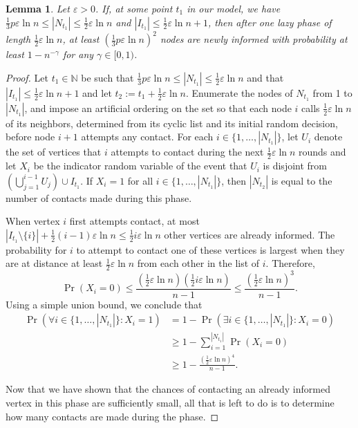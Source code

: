 \documentclass[12pt]{article}
\newtheorem{lemma}[theorem]{Lemma}
\newcommand{\e}{\varepsilon}
\newcommand{\N}{{\mathbb{N}}}
\begin{document}
{\begin{lemma}\label{LazyPhase2}
Let $\e>0$. If, at some point $t_1$ in our model, we have $\frac{1}{3}p\e\ln n \leq |N_{t_1}| \leq \frac{1}{2}\e\ln n$ and $|I_{t_1}|\leq \frac{1}{2}\e\ln n + 1$, then after one lazy phase of length $\frac{1}{2}\e\ln n$, at least $\left(\frac{1}{3}p\e\ln n\right)^2$ nodes are newly informed with probability at least $1-n^{-\gamma}$ for any $\gamma \in [0, 1)$.
\end{lemma}
\begin{proof}
Let $t_1\in \N$ be such that $\frac{1}{3}p\e\ln n \leq |N_{t_1}| \leq \frac{1}{2}\e\ln n$ and that $|I_{t_1}|\leq \frac{1}{2}\e\ln n + 1$ and let $t_2:=t_1+\frac{1}{2}\e\ln n$. Enumerate the nodes of $N_{t_1}$ from 1 to $|N_{t_1}|$, and impose an artificial ordering on the set so that each node $i$ calls $\frac{1}{2}\e\ln n$ of its neighbors, determined from its cyclic list and its initial random decision, before node $i+1$ attempts any contact.
For each $i\in \{1,\dots,|N_{t_1}|\}$, let $U_i$ denote the set of vertices that $i$ attempts to contact during the next $\frac{1}{2}\e\ln n$ rounds and let $X_i$ be the indicator random variable of the event that $U_i$ is disjoint from $\left(\bigcup_{j=1}^{i-1}U_j\right)\cup I_{t_1}$.
If $X_i= 1$ for all $i\in \{1,\dots,|N_{t_1}|\}$, then $|N_{t_2}|$ is equal to the number of contacts made during this phase. 

When vertex $i$ first attempts contact, at most $\left|I_{t_1} \setminus \{i\}\right| + \frac{1}{2}(i - 1)\e\ln n \leq \frac{1}{2}i\e\ln n$ other vertices are already informed. The probability for $i$ to attempt to contact one of these vertices is largest when they are at distance at least $\frac{1}{2}\e\ln n$ from each other in the list of $i$. Therefore, 
\begin{equation}
\Pr(X_i=0)\leq \frac{\left(\tfrac{1}{2}\e\ln n\right)\left(\tfrac{1}{2}i\e\ln n\right)}{n-1}\leq \frac{\left(\tfrac{1}{2}\e\ln n\right)^3}{n-1}.
\end{equation}
Using a simple union bound, we conclude that
\begin{align*}
\Pr(\forall i\in\{1,\dots,|N_{t_1}|\}:X_i=1)& = 1-\Pr(\exists i\in\{1,\dots,|N_{t_1}|\}:X_i=0)\\
&\geq 1-\sum_{i=1}^{|N_{t_1}|}\Pr(X_i=0)\\
&\geq 1-\frac{\left(\tfrac{1}{2}\e\ln n\right)^4}{n-1}.
\end{align*}


Now that we have shown that the chances of contacting an already informed vertex in this phase are sufficiently small, all that is left to do is to determine how many contacts are made during the phase.



\end{proof}}
\end{document}
